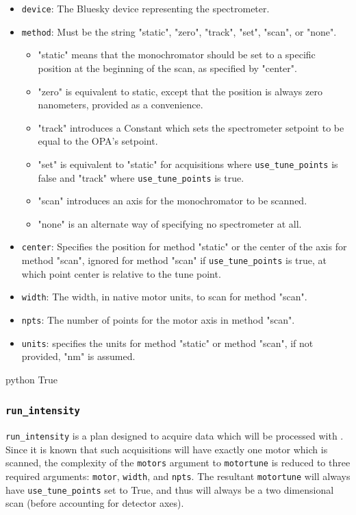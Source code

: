 \begin{itemize}
	\item \texttt{device}: The Bluesky device representing the spectrometer.
	\item \texttt{method}: Must be the string "static", "zero", "track", "set", "scan", or "none".
		\begin{itemize}
			\item "static" means that the monochromator should be set to a specific position at the beginning of the scan, as specified by "center".
			\item "zero" is equivalent to static, except that the position is always zero nanometers, provided as a convenience.
			\item "track" introduces a Constant which sets the spectrometer setpoint to be equal to the OPA's setpoint.
			\item "set" is equivalent to "static" for acquisitions where \texttt{use\_tune\_points} is false and "track" where \texttt{use\_tune\_points} is true.
			\item "scan" introduces an axis for the monochromator to be scanned.
			\item "none" is an alternate way of specifying no spectrometer at all.
		\end{itemize}
	\item \texttt{center}: Specifies the position for method "static" or the center of the axis for method "scan", ignored for method "scan" if \texttt{use\_tune\_points} is true, at which point center is relative to the tune point.
	\item \texttt{width}: The width, in native motor units, to scan for method "scan".
	\item \texttt{npts}: The number of points for the motor axis in method "scan".
	\item \texttt{units}: specifies the units for method "static" or method "scan", if not provided, "nm" is assumed.
\end{itemize}

\begin{codefragment}{python}
True
\end{codefragment}

\subsubsection{\texttt{run\_intensity}}

\texttt{run\_intensity} is a plan designed to acquire data which will be processed with .
Since it is known that such acquisitions will have exactly one motor which is scanned, the complexity of the \texttt{motors} argument to \texttt{motortune} is reduced to three required arguments: \texttt{motor}, \texttt{width}, and \texttt{npts}.
The resultant \texttt{motortune} will always have \texttt{use\_tune\_points} set to True, and thus will always be a two dimensional scan (before accounting for detector axes).

